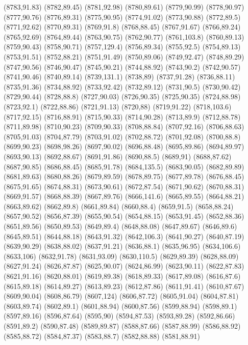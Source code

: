(8783,91.83)
(8782,89.45)
(8781,92.98)
(8780,89.61)
(8779,90.99)
(8778,90.97)
(8777,90.76)
(8776,89.31)
(8775,90.95)
(8774,91.02)
(8773,90.88)
(8772,89.5)
(8771,92.62)
(8770,89.31)
(8769,91.8)
(8768,88.45)
(8767,91.67)
(8766,89.24)
(8765,92.69)
(8764,89.44)
(8763,90.75)
(8762,90.77)
(8761,103.8)
(8760,89.13)
(8759,90.43)
(8758,90.71)
(8757,129.4)
(8756,89.34)
(8755,92.5)
(8754,89.13)
(8753,91.51)
(8752,88.21)
(8751,91.49)
(8750,89.06)
(8749,92.47)
(8748,89.29)
(8747,90.56)
(8746,90.47)
(8745,90.21)
(8744,88.92)
(8743,90.2)
(8742,90.57)
(8741,90.46)
(8740,89.14)
(8739,131.1)
(8738,89)
(8737,91.28)
(8736,88.11)
(8735,91.36)
(8734,88.92)
(8733,92.42)
(8732,89.12)
(8731,90.5)
(8730,90.42)
(8729,90.44)
(8728,88.8)
(8727,90.03)
(8726,90.35)
(8725,90.35)
(8724,88.98)
(8723,92.1)
(8722,88.86)
(8721,91.13)
(8720,88)
(8719,91.22)
(8718,103.6)
(8717,92.15)
(8716,88.91)
(8715,90.33)
(8714,90.28)
(8713,89.9)
(8712,88.78)
(8711,89.98)
(8710,90.23)
(8709,90.33)
(8708,88.84)
(8707,92.16)
(8706,88.63)
(8705,91.03)
(8704,87.79)
(8703,91.02)
(8702,88.72)
(8701,92.08)
(8700,88.8)
(8699,90.23)
(8698,98.26)
(8697,90.02)
(8696,88.48)
(8695,89.86)
(8694,89.97)
(8693,90.13)
(8692,88.67)
(8691,91.86)
(8690,88.5)
(8689,91)
(8688,87.62)
(8687,90.85)
(8686,88.45)
(8685,91.78)
(8684,135.5)
(8683,90.05)
(8682,89.89)
(8681,89.63)
(8680,88.26)
(8679,89.59)
(8678,89.75)
(8677,89.78)
(8676,88.45)
(8675,91.65)
(8674,88.31)
(8673,90.61)
(8672,87.54)
(8671,90.62)
(8670,88.31)
(8669,91.57)
(8668,88.39)
(8667,89.76)
(8666,141.6)
(8665,89.55)
(8664,88.21)
(8663,89.62)
(8662,89.8)
(8661,89.84)
(8660,88.4)
(8659,91.5)
(8658,88.24)
(8657,90.52)
(8656,87.39)
(8655,90.54)
(8654,88.15)
(8653,91.45)
(8652,88.36)
(8651,89.56)
(8650,89.53)
(8649,89.4)
(8648,88.08)
(8647,89.67)
(8646,89.6)
(8645,89.51)
(8644,88.18)
(8643,91.32)
(8642,106.3)
(8641,90.27)
(8640,87.19)
(8639,90.29)
(8638,88.02)
(8637,91.21)
(8636,88.1)
(8635,96.95)
(8634,106.6)
(8633,106)
(8632,91.78)
(8631,93.09)
(8630,110.5)
(8629,89.39)
(8628,88.09)
(8627,91.24)
(8626,87.87)
(8625,90.07)
(8624,86.99)
(8623,90.11)
(8622,87.83)
(8621,91.16)
(8620,88.01)
(8619,89.38)
(8618,89.33)
(8617,89.08)
(8616,87.6)
(8615,89.18)
(8614,89.27)
(8613,89.23)
(8612,87.86)
(8611,91.41)
(8610,87.67)
(8609,90.04)
(8608,86.79)
(8607,124)
(8606,87.72)
(8605,91.04)
(8604,87.81)
(8603,89.74)
(8602,89.1)
(8601,88.94)
(8600,87.56)
(8599,88.94)
(8598,89.1)
(8597,89.16)
(8596,87.64)
(8595,90)
(8594,87.53)
(8593,89.28)
(8592,86.66)
(8591,89.2)
(8590,87.48)
(8589,89.87)
(8588,87.66)
(8587,88.99)
(8586,88.92)
(8585,88.72)
(8584,87.37)
(8583,88.7)
(8582,88.88)
(8581,88.91)
